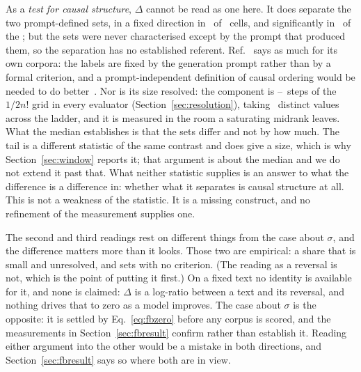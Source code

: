 \documentclass[11pt]{article}
\begin{document}
As a \emph{test for causal structure}, $\Delta$ cannot be read as one
here.  It does separate the two prompt-defined sets, in a fixed
direction in \ContrastNPositive\ of \ContrastNCells\ cells, and
significantly in \ContrastNRejecting\ of the \ContrastNCells; but the
sets were never characterised except by the prompt that produced them, so
the separation has no established referent.  Ref.~\cite{sagawa2026} says as
much for its own corpora: the labels are fixed by the generation prompt
rather than by a formal criterion, and a prompt-independent definition of
causal ordering would be needed to do better~\cite[Sec.~V~B]{sagawa2026}.  Nor is its size resolved: the component is
\CausalCompStepsMin--\CausalCompStepsMax\ steps of the
$1/2n!$ grid in every evaluator (Section~\ref{sec:resolution}), taking
\CausalCompNDistinct\ distinct values across the ladder, and it is
measured in the room a saturating midrank leaves.  What
the median establishes is that the sets differ and not by how much.  The
tail is a different statistic of the same contrast and does give a size,
which is why Section~\ref{sec:window} reports it; that argument is
about the median and we do not extend it past that.  What neither statistic
supplies is an answer to what the difference is a difference in: whether
what it separates is causal structure at all.  This is not a weakness of the
statistic.  It is a missing construct, and no refinement of the measurement
supplies one.

The second and third readings rest on different things from the case
about $\sigma$, and the difference matters more than it looks.  Those two
are empirical: a share that is small and unresolved, and sets with no
criterion.  (The reading as a reversal is not, which is the point of
putting it first.)  On a fixed
text no identity is available for it, and none is claimed: $\Delta$ is a
log-ratio between a
text and its reversal, and nothing drives that to zero as a model improves.  The case about $\sigma$ is the opposite: it is settled by
Eq.~\eqref{eq:fbzero} before any corpus is scored, and the measurements in
Section~\ref{sec:fbresult} confirm rather than establish it.  Reading either
argument into the other would be a mistake in both directions, and
Section~\ref{sec:fbresult} says so where both are in view.
\end{document}
